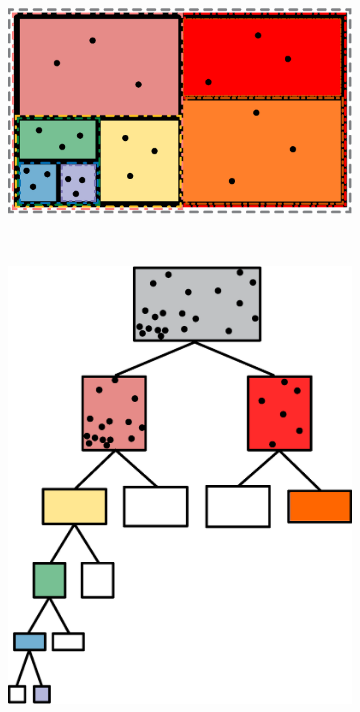 \begin{figure}
        \centering
        \begin{subfigure}[h]{0.45\textwidth}
                \includegraphics[width=\textwidth]{graphics/tree.eps}
                \caption{}
                \label{fig:volumetree}
        \end{subfigure}
        ~ 
        \begin{subfigure}[h]{0.45\textwidth}
                \includegraphics[width=\textwidth]{graphics/tree_memory.eps}

\end{subfigure}
\end{figure}
